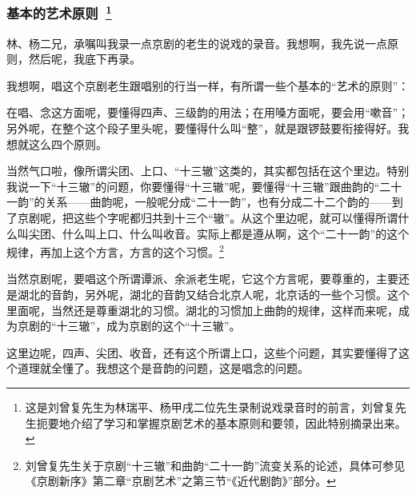 \newpage
\pagestyle{fancy}    %

\subsubsection{{\hei \large 基本的艺术原则}~\protect\footnote{这是刘曾复先生为林瑞平、杨甲戌二位先生录制说戏录音时的前言，刘曾复先生扼要地介绍了学习和掌握京剧艺术的基本原则和要领，因此特别摘录出来。%
}}%

\textrm{林、杨二兄，承嘱叫我录一点京剧的老生的说戏的录音。我想啊，我先说一点原则，然后呢，我底下再录。}

\textrm{我想啊，唱这个京剧老生跟唱别的行当一样，有所谓一些个基本的``艺术的原则''：}

\textrm{在唱、念这方面呢，要懂得四声、三级韵的用法；在用嗓方面呢，要会用``嗽音''；另外呢，在整个这个段子里头呢，要懂得什么叫``整''，就是跟锣鼓要衔接得好。我想就这么四个原则。}

\textrm{当然气口啦，像所谓尖团、上口、``十三辙''这类的，其实都包括在这个里边。特别我说一下``十三辙''的问题，你要懂得``十三辙''呢，要懂得``十三辙''跟曲韵的``二十一韵''的关系------曲韵呢，一般呢分成``二十一韵''，也有分成二十二个韵的------到了京剧呢，把这些个字呢都归共到十三个``辙''。从这个里边呢，就可以懂得所谓什么叫尖团、什么叫上口、什么叫收音。实际上都是遵从啊，这个``二十一韵''的这个规律，再加上这个方言，方言的这个习惯。}\footnote{刘曾复先生关于京剧``十三辙''和曲韵``二十一韵''流变关系的论述，具体可参见《京剧新序》第二章``京剧艺术''之第三节``《近代剧韵》''部分。%
}

\textrm{当然京剧呢，要唱这个所谓谭派、余派老生呢，它这个方言呢，要尊重的，主要还是湖北的音韵，另外呢，湖北的音韵又结合北京人呢，北京话的一些个习惯。这个里面呢，当然还是尊重湖北的习惯。湖北的习惯加上曲韵的规律，这样而来呢，成为京剧的``十三辙''，成为京剧的这个``十三辙''。}

\textrm{这里边呢，四声、尖团、收音，还有这个所谓上口，这些个问题，其实要懂得了这个道理就全懂了。我想这个是音韵的问题，这是唱念的问题。}

